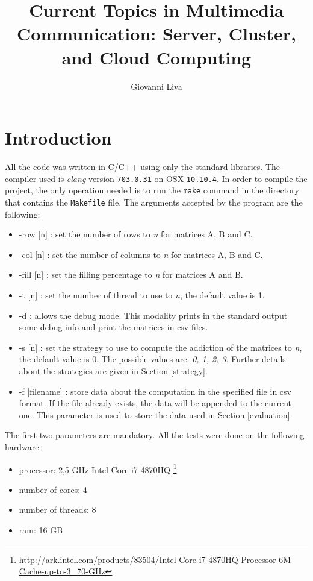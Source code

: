 \documentclass[]{article}
\title{Current Topics in Multimedia Communication: Server, Cluster, and Cloud Computing}
\author{Giovanni Liva}
\begin{document}
\captionsetup[figure]{font=small,skip=0pt}
\maketitle


\section{Introduction}
All the code was written in C/C++ using only the standard libraries. 
The compiler used is \textit{clang} version \texttt{703.0.31} on OSX  \texttt{10.10.4}.
In order to compile the project, the only operation needed is to run the \texttt{make} command in the directory that contains the \texttt{Makefile} file.
The arguments accepted by the program are the following:
\begin{itemize}
    \item -row [n] : set the number of rows to \textit{n} for matrices A, B and C.
    \item -col [n] : set the number of columns to \textit{n} for matrices A, B and C.
    \item -fill [n] : set the filling percentage to \textit{n} for matrices A and B.
    \item -t [n] : set the number of thread to use to \textit{n}, the default value is 1.
    \item -d : allows the debug mode. This modality prints in the standard output some debug info and print the matrices in csv files.
    \item -s [n] : set the strategy to use to compute the addiction of the matrices to \textit{n}, the default value is 0. The possible values are: \textit{0, 1, 2, 3}. Further details about the strategies are given in Section \ref{strategy}.
    \item -f [filename] : store data about the computation in the specified file in csv format. If the file already exists, the data will be appended to the current one. This parameter is used to store the data used in Section \ref{evaluation}.
\end{itemize}
The first two parameters are mandatory.
All the tests were done on the following hardware:
\begin{itemize}
    \item processor: 2,5 GHz Intel Core i7-4870HQ \footnote{\url{http://ark.intel.com/products/83504/Intel-Core-i7-4870HQ-Processor-6M-Cache-up-to-3_70-GHz}}
    \item number of cores: 4
    \item number of threads: 8
    \item ram: 16 GB
\end{itemize}
\end{document}
